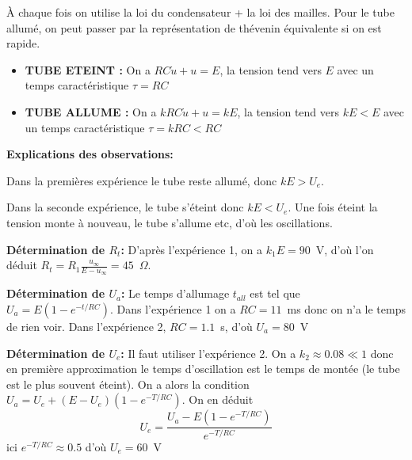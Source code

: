 \begin{solution}

À chaque fois on utilise la loi du condensateur + la loi des mailles. Pour le tube allumé, on peut passer par la représentation de thévenin équivalente si on est rapide.
\begin{itemize}
    \item \textbf{TUBE ETEINT :} On a $RC \dot{u} + u = E$, la tension tend vers $E$ avec un temps caractéristique $\tau = RC$
    \item \textbf{TUBE ALLUME :} On a $kRC \dot{u} + u = kE$, la tension tend vers $kE < E$ avec un temps caractéristique $\tau = kRC < RC$
\end{itemize}

\textbf{Explications des observations: }

Dans la premières expérience le tube reste allumé, donc $kE > U_e$. 

Dans la seconde expérience, le tube s'éteint donc $kE < U_e$. Une fois éteint la tension monte à nouveau, le tube s'allume etc, d'où les oscillations.

\textbf{Détermination de $R_t$: } D'après l'expérience 1, on a $k_1E = 90$~V, d'où l'on déduit $R_t = R_1\frac{u_\infty}{E-u_\infty} = 45$~$\Omega$.

\textbf{Détermination de $U_a$: } Le temps d'allumage $t_{all}$ est tel que $U_a = E(1-e^{-t/RC})$. Dans l'expérience 1 on a $RC = 11$~ms donc on n'a le temps de rien voir. Dans l'expérience 2, $RC = 1.1$~s, d'où $U_a = 80$~V

\textbf{Détermination de $U_e$: } Il faut utiliser l'expérience 2. On a $k_2 \approx 0.08 \ll 1$ donc en première approximation le temps d'oscillation est le temps de montée (le tube est le plus souvent éteint). On a alors la condition $U_a = U_e + (E-U_e)(1-e^{-T/RC})$. On en déduit 
$$
U_e = \frac{U_a - E (1-e^{-T/RC})}{e^{-T/RC}}
$$
ici $e^{-T/RC} \approx 0.5$ d'où $U_e = 60$~V

\end{solution}